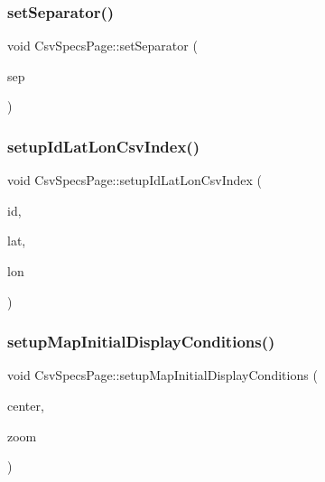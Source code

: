 \mbox{\label{class_csv_specs_page_afaf960e286cc199363efb92e50e01ff0}} 
\subsubsection{\texorpdfstring{setSeparator()}{setSeparator()}}
{\footnotesize\ttfamily void Csv\+Specs\+Page\+::set\+Separator (\begin{DoxyParamCaption}\item[{Q\+Char}]{sep }\end{DoxyParamCaption})\hspace{0.3cm}{\ttfamily [inline]}}

\mbox{\label{class_csv_specs_page_ad3ac8f45d4c1bdcae7bc5eaae8fb773b}} 
\subsubsection{\texorpdfstring{setupIdLatLonCsvIndex()}{setupIdLatLonCsvIndex()}}
{\footnotesize\ttfamily void Csv\+Specs\+Page\+::setup\+Id\+Lat\+Lon\+Csv\+Index (\begin{DoxyParamCaption}\item[{int}]{id,  }\item[{int}]{lat,  }\item[{int}]{lon }\end{DoxyParamCaption})}

\mbox{\label{class_csv_specs_page_a0de0afb58bd383db7f2d8cad1e5c1435}} 
\subsubsection{\texorpdfstring{setupMapInitialDisplayConditions()}{setupMapInitialDisplayConditions()}}
{\footnotesize\ttfamily void Csv\+Specs\+Page\+::setup\+Map\+Initial\+Display\+Conditions (\begin{DoxyParamCaption}\item[{const Q\+PointF \&}]{center,  }\item[{int}]{zoom }\end{DoxyParamCaption})}



